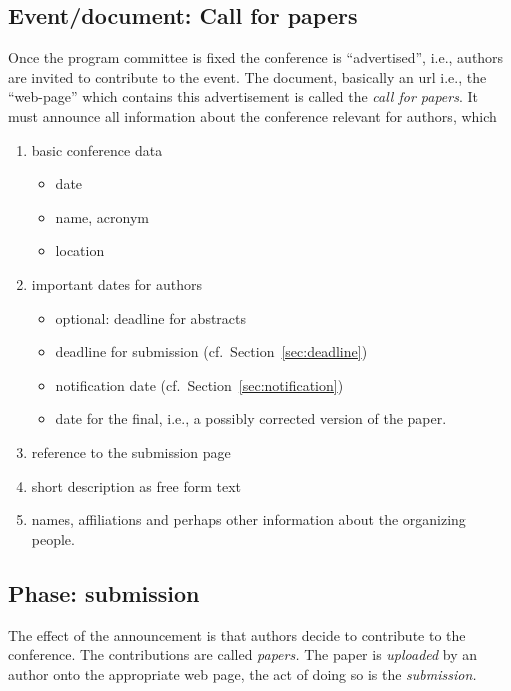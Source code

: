 \subsection{Event/document: Call for papers}
\label{sec:cfpapers}

Once the program committee is fixed the conference is ``advertised'', i.e.,
authors are invited to contribute to the event. The document, basically an
url i.e., the ``web-page'' which contains this advertisement is called the
\emph{call for papers}. It must announce all information about the
conference relevant for authors, which

\begin{enumerate}
\item basic conference data
  \begin{itemize}
  \item date
  \item name, acronym
  \item location
  \end{itemize}
\item important dates for authors
  \begin{itemize}
  \item optional: deadline for abstracts
  \item deadline for submission (cf.\ Section~\ref{sec:deadline})
  \item notification date (cf.\ Section~\ref{sec:notification})
  \item date for the final, i.e., a possibly corrected version of the
    paper.


  \end{itemize}
\item reference to the submission page
\item short description as free form text
\item names, affiliations and perhaps other information about the
  organizing people.
\end{enumerate}



\subsection{Phase: submission}
\label{sec:submission}

The effect of the announcement is that authors decide to contribute to the
conference. The contributions are called \emph{papers.} The paper is
\emph{uploaded} by an author onto the appropriate web page, the act of doing
so is the \emph{submission.} 

